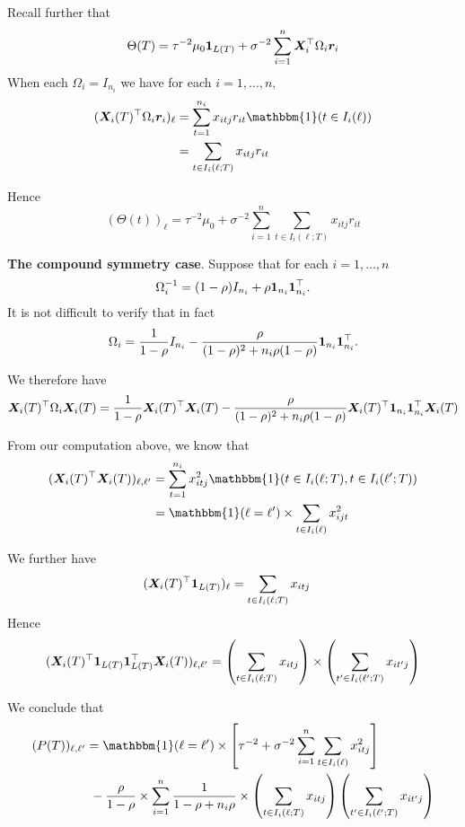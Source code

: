 \documentclass[11pt]{article}
\begin{document}
Recall further that
$$
\Theta(T) = \tau^{-2}\mu_{0}\boldsymbol{1}_{L(T)} + \sigma^{-2}\sum_{i = 1}^{n}{\bm{X}_{i}^{\top}\Omega_{i}\bm{r}_{i}}
$$
When each $\Omega_{i} = I_{n_{i}}$ we have for each $i = 1, \ldots, n,$
\begin{align*}
(\bX_{i}(T)^{\top}\Omega_{i}\br_{i})_{\ell} &= \sum_{t = 1}^{n_{i}}{x_{itj}r_{it}\mathbbm{1}(t \in I_{i}(\ell))} \\
&= \sum_{t \in I_{i}(\ell;T)}{x_{itj}r_{it}}
\end{align*}

Hence
$$
(\Theta(t))_{\ell} = \tau^{-2}\mu_{0} + \sigma^{-2}\sum_{i = 1}^{n}{\sum_{t \in I_{i}(\ell;T)}{x_{itj}r_{it}}}
$$

\textbf{The compound symmetry case}. Suppose that for each $i = 1, \ldots, n$ 
$$
\Omega_{i}^{-1} = (1 - \rho)I_{n_{i}} + \rho \boldsymbol{1}_{n_{i}}\boldsymbol{1}_{n_{i}}^{\top}.
$$
It is not difficult to verify that in fact
$$
\Omega_{i} = \frac{1}{1 - \rho}I_{n_{i}} - \frac{\rho}{(1 - \rho)^{2} + n_{i}\rho(1 - \rho)}\boldsymbol{1}_{n_{i}}\boldsymbol{1}_{n_{i}}^{\top}.
$$

We therefore have
$$
\bm{X}_{i}(T)^{\top}\Omega_{i}\bm{X}_{i}(T) = \frac{1}{1 - \rho}\bm{X}_{i}(T)^{\top}\bm{X}_{i}(T) - \frac{\rho}{(1 - \rho)^{2} + n_{i}\rho(1 - \rho)}\bm{X}_{i}(T)^{\top}\boldsymbol{1}_{n_{i}}\boldsymbol{1}_{n_{i}}^{\top}\bm{X}_{i}(T) 
$$

From our computation above, we know that
\begin{align*}
(\bX_{i}(T)^{\top}\bX_{i}(T))_{\ell,\ell'} &= \sum_{t = 1}^{n_{i}}{x_{itj}^{2}\mathbbm{1}(t \in I_{i}(\ell;T), t \in I_{i}(\ell';T))} \\
&= \mathbbm{1}(\ell = \ell') \times \sum_{t \in I_{i}(\ell)}{x_{ijt}^{2}}
\end{align*}

We further have
\begin{align*}
(\bm{X}_{i}(T)^{\top}\boldsymbol{1}_{L(T)})_{\ell} &= \sum_{t \in I_{i}(\ell;T)}{x_{itj}}
\end{align*}
Hence
$$
(\bm{X}_{i}(T)^{\top}\boldsymbol{1}_{L(T)}\boldsymbol{1}_{L(T)}^{\top}\bm{X}_{i}(T))_{\ell,\ell'} = \left(\sum_{t \in I_{i}(\ell;T)}{x_{itj}}\right) \times \left(\sum_{t' \in I_{i}(\ell';T)}{x_{it'j}}\right)
$$

We conclude that
\begin{align*}
(P(T))_{\ell,\ell'} &= \mathbbm{1}(\ell = \ell') \times \left[\tau^{-2} + \sigma^{-2}\sum_{i = 1}^{n}{\sum_{t \in I_{i}(\ell)}{x_{itj}^{2}}}\right] \\
&~-\frac{\rho}{1 - \rho} \times \sum_{i = 1}^{n}{\frac{1}{1 - \rho + n_{i}\rho} \times \left(\sum_{t \in I_{i}(\ell;T)}{x_{itj}}\right)\left(\sum_{t' \in I_{i}(\ell';T)}{x_{it'j}}\right)}
\end{align*}
\end{document}
